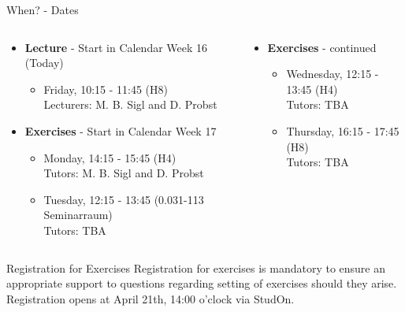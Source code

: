 \begin{frame}{When? - Dates}
	\begin{columns}
		\begin{column}{0.5\textwidth}
			\begin{itemize}
				\item \textbf{Lecture} - Start in Calendar Week 16 (Today)
				      \begin{itemize}
					      \item Friday, 10:15 - 11:45 (H8) \\
					            {\color{gray}Lecturers: M. B. Sigl and D. Probst}
				      \end{itemize}
				\item \textbf{Exercises} - Start in Calendar Week 17
				      \begin{itemize}
					      \item Monday, 14:15 - 15:45 (H4) \\
					            {\color{gray}Tutors: M. B. Sigl and D. Probst}
					      \item Tuesday, 12:15 - 13:45 (0.031-113 Seminarraum) \\
					            {\color{gray}Tutors: TBA}
				      \end{itemize}
			\end{itemize}
		\end{column}

		\begin{column}{0.5\textwidth}
			\begin{itemize}
				\item \textbf{Exercises} - continued
				      \begin{itemize}
					      \item Wednesday, 	12:15 - 13:45 (H4) \\
					            {\color{gray}Tutors: TBA}
					      \item Thursday, 16:15 - 17:45 (H8) \\
					            {\color{gray}Tutors: TBA}
				      \end{itemize}
			\end{itemize}
		\end{column}
	\end{columns}

	\begin{block}{Registration for Exercises}
		Registration for exercises is mandatory to ensure an appropriate support to questions regarding setting of exercises should they arise.
			{\color{faured}Registration opens at April 21th, 14:00 o'clock via StudOn.}
	\end{block}
\end{frame}

